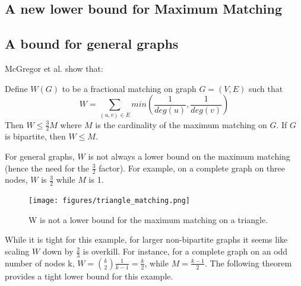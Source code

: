 \subsection{A new lower bound for Maximum Matching}
\subsection{A bound for general graphs}
McGregor et al. \cite{mcgregor16} show that:

\begin{theorem}
Define $W(G)$ to be a fractional matching on graph $G = (V,E)$ such that $$W = \sum_{(u,v) \in E} min(\frac{1}{deg(u)},\frac{1}{deg(v)})$$
Then $W\leq \frac{3}{2} M$ where $M$ is the cardinality of the maximum matching on $G$.
If $G$ is bipartite, then $W \leq M$.
\end{theorem}

For general graphs, $W$ is not always a lower bound on the maximum matching (hence the need for the $\frac{3}{2}$ factor).  For example, on a complete graph on three nodes, $W$ is $\frac{3}{2}$ while $M$ is 1.

\begin{figure}[h]
\texttt{[image: figures/triangle\_matching.png]}
\centering
\caption{W is not a lower bound for the maximum matching on a triangle.}
\end{figure}


While it is tight for this example, for larger non-bipartite graphs it seems like scaling $W$ down by $\frac{2}{3}$ is overkill.  For instance, for a complete graph on an odd number of nodes k, $W = {{k}\choose{2}} \frac{1}{k-1} = \frac{k}{2}$, while $M = \frac{k-1}{2}$.
The following theorem provides a tight lower bound for this example.

